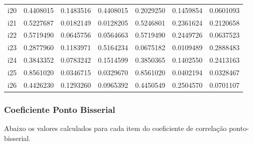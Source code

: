 \documentclass[]{article}
\begin{document}
\begin{table}[!h]
\begin{tabular}[t]{lrrrrrr}
i20 & 0.4408015 & 0.1483516 & 0.4408015 & 0.2029250 & 0.1459854 & 0.0601093\\
\addlinespace
i21 & 0.5227687 & 0.0182149 & 0.0128205 & 0.5246801 & 0.2361624 & 0.2120658\\
i22 & 0.5719490 & 0.0645756 & 0.0564663 & 0.5719490 & 0.2449726 & 0.0637523\\
i23 & 0.2877960 & 0.1183971 & 0.5164234 & 0.0675182 & 0.0109489 & 0.2888483\\
i24 & 0.3843352 & 0.0783242 & 0.1514599 & 0.3850365 & 0.1402550 & 0.2413163\\
i25 & 0.8561020 & 0.0346715 & 0.0329670 & 0.8561020 & 0.0402194 & 0.0328467\\
i26 & 0.4426230 & 0.1293260 & 0.0965392 & 0.4450549 & 0.2504570 & 0.0701107\\
\bottomrule
\end{tabular}
\end{table}

\newpage

\subsubsection{Coeficiente Ponto
Bisserial}\label{coeficiente-ponto-bisserial}

Abaixo os valores calculados para cada item do coeficiente de correlação
ponto-bisserial.

\begin{table}[!h]

\caption{\label{tab:unnamed-chunk-2}Coeficiente de Correlação Ponto-Bisserial}
\centering
{}
\end{table}

\begin{table}[!h]

\caption{\label{tab:unnamed-chunk-2}Coeficiente de Correlação Ponto-Bisserial}
\centering
{}
\end{table}
\end{document}
